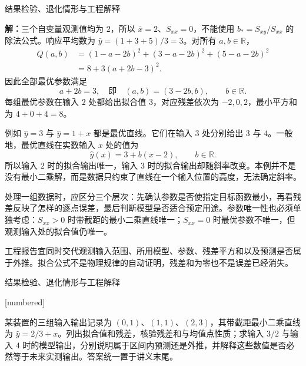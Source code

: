 \documentclass[aspectratio=169,10pt,fontset=fandol]{ctexbeamer}
\makeatletter
\newcommand{\mathagentexerciselabelcontext}[1]{%
\hypertarget<1>{#1}{}%
\edef\@currentHref{#1}%
}
\makeatother
\begin{document}
\begin{frame}[t,fragile]{结果检验、退化情形与工程解释}
\small
{\small
\par\noindent\textbf{解：}三个自变量观测值均为 $2$，所以 $\bar{x}=2$、$S_{xx}=0$，不能使用 $b_*=S_{xy}/S_{xx}$ 的除法公式。响应平均数为 $\bar{y}=(1+3+5)/3=3$。对所有 $a,b\in\mathbb{R}$，
\[
\begin{aligned}
Q(a,b)&=(1-a-2b)^2+(3-a-2b)^2+(5-a-2b)^2\\
&=8+3(a+2b-3)^2.
\end{aligned}
\]
因此全部最优参数满足
\[
a+2b=3,
\quad\text{即}\quad (a,b)=(3-2b,b),\qquad b\in\mathbb{R}.
\]
每组最优参数在输入 $2$ 处都给出拟合值 $3$，对应残差依次为 $-2,0,2$，最小平方和为 $4+0+4=8$。


}
{\small
例如 $\hat{y}=3$ 与 $\hat{y}=1+x$ 都是最优直线。它们在输入 $3$ 处分别给出 $3$ 与 $4$。一般地，最优直线在实数输入 $x$ 处的值为
\[
\hat{y}(x)=3+b(x-2),\qquad b\in\mathbb{R}.
\]
所以输入 $2$ 时的拟合输出唯一，输入 $3$ 时的拟合输出却随斜率改变。本例并不是没有最小二乘解，而是数据只约束了直线在一个输入位置的高度，无法确定斜率。\par

}
{\small
处理一组数据时，应区分三个层次：先确认参数是否使指定目标函数最小，再看残差反映了怎样的逐点误差，最后判断模型是否适合预定用途。参数唯一性也必须单独考虑：$S_{xx}>0$ 时带截距的最小二乘直线唯一；$S_{xx}=0$ 时最优参数不唯一，但观测输入处的拟合值仍唯一。


}
{\small
工程报告宜同时交代观测输入范围、所用模型、参数、残差平方和以及预测是否属于外推。拟合公式不是物理规律的自动证明，残差和为零也不是误差已经消失。\par

}
\end{frame}
\begin{frame}[t,fragile]{结果检验、退化情形与工程解释}
\normalsize
{\normalsize
[numbered]
\mathagentexerciselabelcontext{mathagent.exercise.U0050.0}
\begin{exercise}
\label{mathagent:exercise:792316d6ae426af3441a87022eb342411ffcb273e3da7957f4be83fb59518d0a}
某装置的三组输入输出记录为 $(0,1)$、$(1,1)$、$(2,3)$，其带截距最小二乘直线为 $\hat{y}=2/3+x$。列出拟合值和残差，核验残差和与均值点性质；求输入 $3/2$ 与输入 $4$ 时的模型输出，分别说明属于区间内预测还是外推，并解释这些数值是否必然等于未来实测输出。答案统一置于讲义末尾。
\end{exercise}
}
\end{frame}
\end{document}
